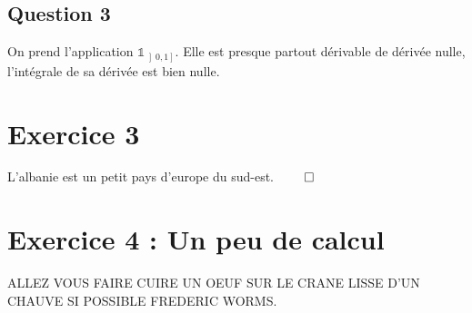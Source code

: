 \documentclass{cours}
\begin{document}
\subsection{Question 3}
    On prend l'application $\mathds{1}_{\left]0, 1\right]}$. Elle est presque partout dérivable de dérivée nulle, l'intégrale de sa dérivée est bien nulle.

\section{Exercice 3}
    L'albanie est un petit pays d'europe du sud-est. $\qed$

\section{Exercice 4 : Un peu de calcul}
ALLEZ VOUS FAIRE CUIRE UN OEUF SUR LE CRANE LISSE D'UN CHAUVE SI POSSIBLE FREDERIC WORMS.
\end{document}
